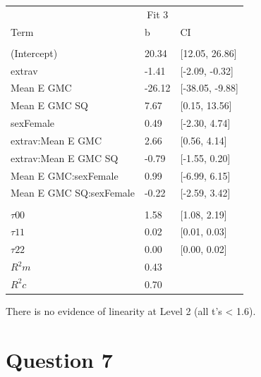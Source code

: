 \documentclass[]{article}
\begin{document}
\begin{tabular}{lll}
\toprule
\multicolumn{1}{c}{ } & \multicolumn{1}{c}{Fit 3} \\
\cmidrule(l{2pt}r{2pt}){2-2}
Term & b & CI\\
\midrule
\addlinespace[0.3em]
\multicolumn{3}{l}{\textbf{Fixed}}\\
\hspace{1em}(Intercept) & 20.34 & [12.05, 26.86]\\
\hspace{1em}extrav & -1.41 & [-2.09, -0.32]\\
\hspace{1em}Mean E GMC & -26.12 & [-38.05, -9.88]\\
\hspace{1em}Mean E GMC SQ & 7.67 & [0.15, 13.56]\\
\hspace{1em}sexFemale & 0.49 & [-2.30, 4.74]\\
\hspace{1em}extrav:Mean E GMC & 2.66 & [0.56, 4.14]\\
\hspace{1em}extrav:Mean E GMC SQ & -0.79 & [-1.55, 0.20]\\
\hspace{1em}Mean E GMC:sexFemale & 0.99 & [-6.99, 6.15]\\
\hspace{1em}Mean E GMC SQ:sexFemale & -0.22 & [-2.59, 3.42]\\
\addlinespace[0.3em]
\multicolumn{3}{l}{\textbf{Random}}\\
\hspace{1em}$\tau {00}$ & 1.58 & [1.08, 2.19]\\
\hspace{1em}$\tau {11}$ & 0.02 & [0.01, 0.03]\\
\hspace{1em}$\tau {22}$ & 0.00 & [0.00, 0.02]\\
$R^2 m$ & 0.43 & \\
$R^2 c$ & 0.70 & \\
\bottomrule
\end{tabular}

There is no evidence of linearity at Level 2 (all t's \textless{} 1.6).

\section{Question 7}\label{question-7}
\end{document}
